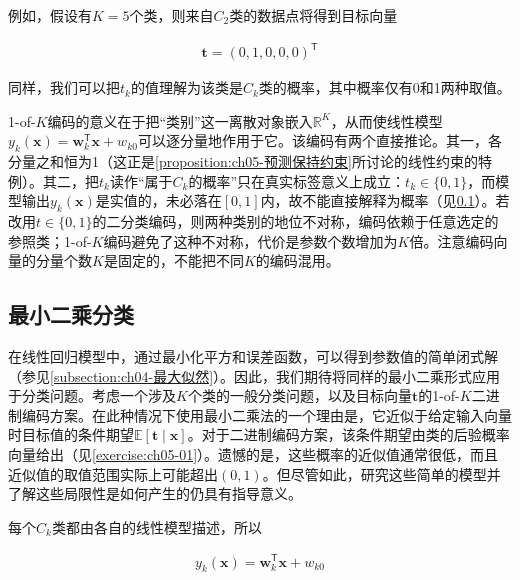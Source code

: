 \documentclass[../../main.tex]{subfiles}
\begin{document}
例如，假设有$K=5$个类，则来自$C_2$类的数据点将得到目标向量

\begin{align}
  \boldsymbol{t}=(0,1,0,0,0)^{\mathsf{T}}
  \label{align:ch05-1ofK向量}
\end{align}

同样，我们可以把$t_k$的值理解为该类是$C_k$类的概率，其中概率仅有0和1两种取值。

\begin{remark}
1-of-$K$编码的意义在于把“类别”这一离散对象嵌入$\mathbb{R}^{K}$，从而使线性模型$y_k(\boldsymbol{x})=\boldsymbol{w}_k^{\mathsf{T}}\boldsymbol{x}+w_{k0}$可以逐分量地作用于它。该编码有两个直接推论。其一，各分量之和恒为1（这正是\cref{proposition:ch05-预测保持约束}所讨论的线性约束的特例）。其二，把$t_k$读作“属于$C_k$的概率”只在真实标签意义上成立：$t_k\in\{0,1\}$，而模型输出$y_k(\boldsymbol{x})$是实值的，未必落在$[0,1]$内，故不能直接解释为概率（见\cref{subsection:ch05-最小二乘分类}）。若改用$t\in\{0,1\}$的二分类编码，则两种类别的地位不对称，编码依赖于任意选定的参照类；1-of-$K$编码避免了这种不对称，代价是参数个数增加为$K$倍。注意编码向量的分量个数$K$是固定的，不能把不同$K$的编码混用。
\end{remark}

\subsection{最小二乘分类}\label{subsection:ch05-最小二乘分类}

在线性回归模型中，通过最小化平方和误差函数，可以得到参数值的简单闭式解（参见\cref{subsection:ch04-最大似然}）。因此，我们期待将同样的最小二乘形式应用于分类问题。考虑一个涉及$K$个类的一般分类问题，以及目标向量$\boldsymbol{t}$的1-of-$K$二进制编码方案。在此种情况下使用最小二乘法的一个理由是，它近似于给定输入向量时目标值的条件期望$\mathbb{E}[\boldsymbol{t}\mid\boldsymbol{x}]$。对于二进制编码方案，该条件期望由类的后验概率向量给出（见\cref{exercise:ch05-01}）。遗憾的是，这些概率的近似值通常很低，而且近似值的取值范围实际上可能超出$(0,1)$。但尽管如此，研究这些简单的模型并了解这些局限性是如何产生的仍具有指导意义。

每个$C_k$类都由各自的线性模型描述，所以

\begin{align}
  y_k(\boldsymbol{x})=\boldsymbol{w}_k^{\mathsf{T}}\boldsymbol{x}+w_{k0}
  \label{align:ch05-多类线性模型}
\end{align}
\end{document}
